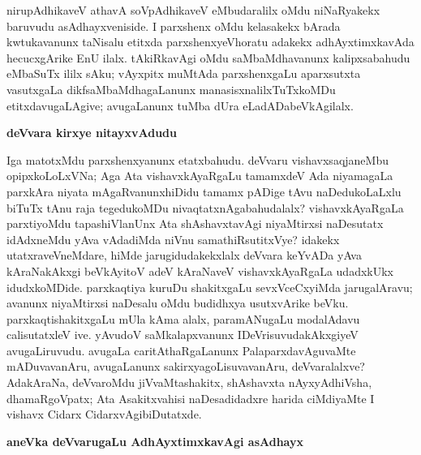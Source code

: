 niru\-pAdhikaveV athavA soVpAdhikaveV eMbudaralilx oMdu niNaRyakekx baruvudu asAdhayx\-veniside. I parxshenx oMdu kelasakekx bArada kwtukavanunx taNisalu etitxda parxshenxyeV\break horatu adakekx adhAyxtimxkavAda hecucxgArike EnU ilalx. tAkiRkavAgi oMdu saMbaMdha\-vanunx kalipxsabahudu eMbaSuTx ililx sAku; vAyxpitx muMtAda parxshenxgaLu aparxsutxta vasutxgaLa dikfsaMbaMdhagaLanunx manasisxnalilxTuTxkoMDu etitxdavugaLAgive; avugaLanunx tuMba dUra eLadADabeVkAgilalx.

\smallskip
\begin{center}
{\Large\bf deVvara kirxye nitayxvAdudu}
\end{center}

Iga matotxMdu parxshenxyanunx etatxbahudu. deVvaru vishavxsaqjaneMbu opipx\-koLoLxVNa; Aga Ata vishavxkAyaRgaLu tamamxdeV Ada niyamagaLa parxkAra niyata mAgaRvanunx\break hiDidu tamamx pADige tAvu naDedukoLaLxlu biTuTx tAnu raja tegedukoMDu nivaqtatx\-nAgabahudalalx? vishavxkAyaRgaLa parxtiyoMdu tapashiVlanUnx Ata shAshavxtavAgi niyaMtirxsi naDesutatx idAdxneMdu yAva vAdadiMda niVnu samathiRsutitxVye? idakekx utatxra\-veVneMdare, hiMde jarugidudakekxlalx deVvara keYvADa yAva kAraNakAkxgi beVkAyitoV adeV kAraNaveV vishavxkAyaRgaLa udadxkUkx idudxkoMDide. parxkaqtiya kuruDu shakitxgaLu sevxVceCxyiMda jarugalAravu; avanunx niyaMtirxsi naDesalu oMdu budidhxya usutxvArike beVku. parxkaqtishakitxgaLu mUla kAma alalx, paramANugaLu modalAdavu calisutatxleV ive. yAvudoV saMkalapxvanunx IDeVrisuvudakAkxgiyeV avugaLiruvudu. avugaLa caritAthaRgaLanunx PalaparxdavAguvaMte mADuvavanAru, avugaLanunx sakirxyagoLisu\-vavanAru, deVvaralalxve? AdakAraNa, deVvaroMdu jiVvaMtashakitx, shAshavxta nAyxyAdhiVsha, dhamaRgoVpatx; Ata Asakitxvahisi naDesadidadxre harida ciMdiyaMte I vishavx Cidarx Cidarx\-vAgibiDutatxde.

\smallskip
\begin{center}
{\Large\bf aneVka deVvarugaLu AdhAyxtimxkavAgi asAdhayx}
\end{center}

